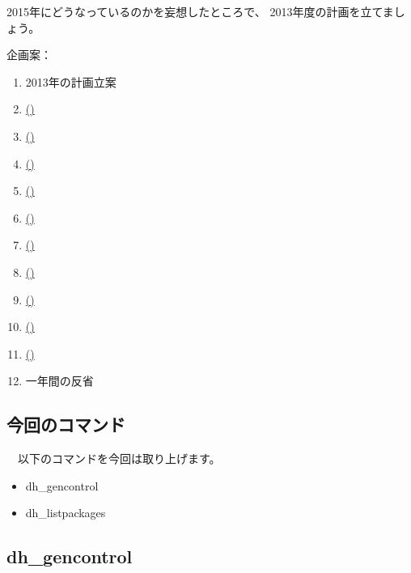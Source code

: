 \documentclass[mingoth,a4paper]{jsarticle}
\begin{document}
2015年にどうなっているのかを妄想したところで、
2013年度の計画を立てましょう。

企画案：
{\LARGE
\begin{enumerate}
 \item 2013年の計画立案
 \item  \underline{(\hspace{10cm})}
 \item  \underline{(\hspace{10cm})}
 \item  \underline{(\hspace{10cm})}
 \item  \underline{(\hspace{10cm})}
 \item  \underline{(\hspace{10cm})}
 \item  \underline{(\hspace{10cm})}
 \item  \underline{(\hspace{10cm})}
 \item  \underline{(\hspace{10cm})}
 \item  \underline{(\hspace{10cm})}
 \item  \underline{(\hspace{10cm})}
 \item 一年間の反省
\end{enumerate}
}



\subsection{今回のコマンド}

　以下のコマンドを今回は取り上げます。

\begin{itemize}
\item dh\_gencontrol
\item dh\_listpackages
\end{itemize}

\subsection{dh\_gencontrol}
\end{document}
